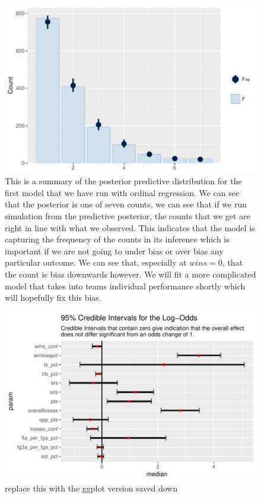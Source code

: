 \documentclass[10pt,a4paper, hidelinks]{article} %
\begin{document}
\begin{figure}[H]
	\centering
	\includegraphics[width=0.7\linewidth]{../fig/polr_nonames_pp}
	\caption{This is a summary of the posterior predictive distribution for the first model that we have run with ordinal regression. We can see that the posterior is one of seven counts, we can see that if we run simulation from the predictive posterior, the counts that we get are right in line with what we observed. This indicates that the model is capturing the frequency of the counts in its inference which is important if we are not going to under bias or over bias any particular outcome. We can see that, especially at $wins = 0$, that the count is bias downwards however. We will fit a more complicated model that takes into teams individual performance shortly which will hopefully fix this bias.}
	\label{fig:polrnonamespp}
\end{figure}



\begin{figure}[H]
	\centering
	\includegraphics[width=1\linewidth]{../fig/polr_coef}
	\caption{replace this with the ggplot version saved down}
	\label{fig:polr_coef}
\end{figure}
\end{document}

